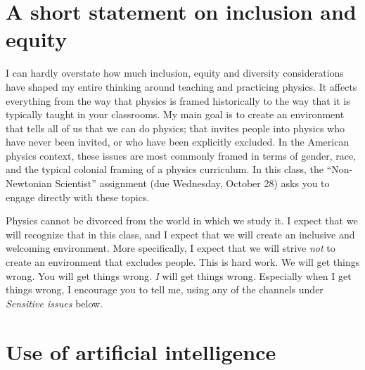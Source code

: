\documentclass{tufte-handout}
\begin{document}

\section{A short statement on inclusion and equity}\label{sec:nonnewtonian}

I can hardly overstate how much inclusion, equity and diversity considerations
have shaped my entire thinking around teaching and practicing physics. It
affects everything from the way that physics is framed historically to the way
that it is typically taught in your classrooms. My main goal is to create an
environment that tells all of us that we can do physics; that invites people
into physics who have never been invited, or who have been explicitly excluded.
In the American physics context, these issues are most commonly framed in terms
of gender, race, and the typical colonial framing of a physics curriculum. In
this class, the ``Non-Newtonian Scientist'' assignment (due Wednesday, October 28)
asks you to engage directly with these topics.

Physics cannot be divorced from the world in which we study it. I expect that we
will recognize that in this class, and I expect that we will create an inclusive
and welcoming environment. More specifically, I expect that we will strive
\textit{not} to create an environment that excludes people. This is hard work.
We will get things wrong. You will get things wrong. \textit{I} will get things
wrong. Especially when I get things wrong, I encourage you to tell me, using
any of the channels under \emph{Sensitive issues} below.

\section{Use of artificial intelligence}\label{sec:ai}
\end{document}
